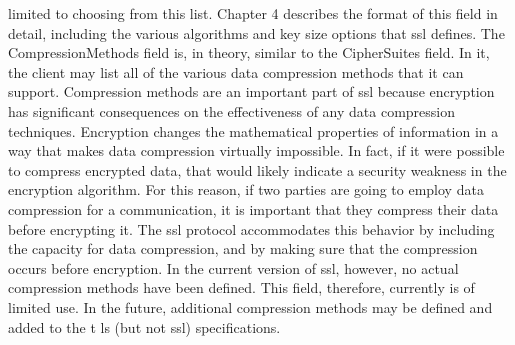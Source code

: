 limited to choosing from this list. Chapter 4 describes the format of
this field in detail, including the various algorithms and key size options that ssl defines.
The CompressionMethods field is, in theory, similar to the CipherSuites field. In it, the client may list all of the various data compression methods that it can support. Compression methods are an
important part of ssl because encryption has significant consequences on the effectiveness of any data compression techniques. Encryption changes the mathematical properties of information in a
way that makes data compression virtually impossible. In fact, if it
were possible to compress encrypted data, that would likely indicate a
security weakness in the encryption algorithm. For this reason, if two
parties are going to employ data compression for a communication, it
is important that they compress their data before encrypting it. The
ssl protocol accommodates this behavior by including the capacity
for data compression, and by making sure that the compression occurs before encryption. In the current version of ssl, however, no actual compression methods have been defined. This field, therefore,
currently is of limited use. In the future, additional compression
methods may be defined and added to the t ls (but not ssl) specifications.
